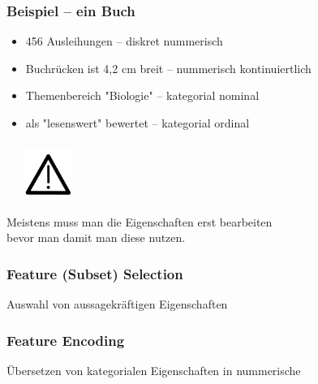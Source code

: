 \documentclass[aspectratio=169]{beamer}
\begin{document}
\begin{frame}
  \frametitle{Beispiel -- ein Buch}
  \begin{block}{}
    \begin{itemize}
    \item 456 Ausleihungen -- diskret nummerisch
    \item Buchrücken ist 4,2 cm breit -- nummerisch kontinuiertlich      
    \item Themenbereich "Biologie"  -- kategorial nominal
    \item als "lesenswert" bewertet -- kategorial ordinal
    \end{itemize}
  \end{block}        
\end{frame}

\begin{frame}
  \frametitle{}
  \begin{block}{}
    \begin{minipage}{0.15\textwidth}
      \ \ \
      \includegraphics[width=1.6cm]{images/kuf_icons_warning_triangle.pdf}
    \end{minipage}
    \hfill
    \begin{minipage}{0.8\textwidth}
       Meistens muss man die Eigenschaften erst bearbeiten\\ bevor man
       damit man diese nutzen.
    \end{minipage}
  \end{block}
\end{frame}

\begin{frame}
  \frametitle{Feature (Subset) Selection}
  \begin{block}{}
    \begin{center}
      Auswahl von aussagekräftigen Eigenschaften
    \end{center}  
  \end{block}
\end{frame}  

\begin{frame}
  \frametitle{Feature Encoding}
  \begin{block}{}
    \begin{center}
      Übersetzen von kategorialen Eigenschaften in nummerische
    \end{center}
  \end{block}
\end{frame}
\end{document}
